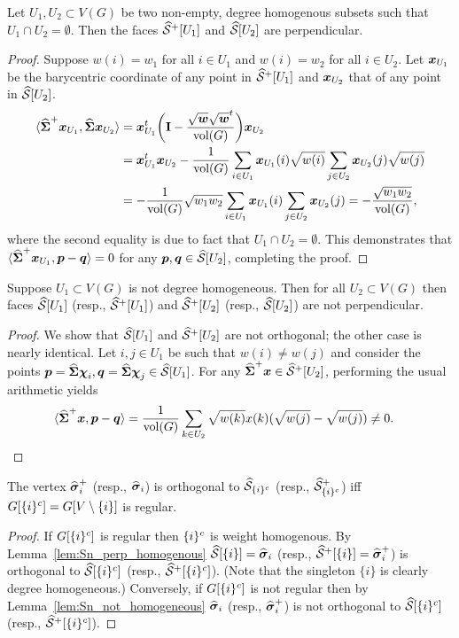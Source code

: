 \begin{lemma}
	\label{lem:Sn_perp_homogenous}
	Let $U_1,U_2\subset V(G)$ be two non-empty, degree homogenous subsets such that $U_1\cap U_2=\emptyset$. Then the faces $\widehat{\mathcal{S}}^+[U_1]$ and $\widehat{\mathcal{S}}[U_2]$ are perpendicular. 
\end{lemma}
\begin{proof}
	Suppose $w(i)=w_1$ for all $i\in U_1$ and $w(i)=w_2$ for all $i\in U_2$. Let $\vb*{x}_{U_1}$ be the barycentric coordinate of any point in $\widehat{\mathcal{S}}^+[U_1]$ and $\vb*{x}_{U_2}$ that of any point in $\widehat{\mathcal{S}}[U_2]$. 
	\begin{align*}
	\langle \widehat{\boldsymbol{\Sigma}}^+\vb*{x}_{U_1},\widehat{\boldsymbol{\Sigma}}\vb*{x}_{U_2}\rangle &= \vb*{x}_{U_1}^t \bigg(\vb{I}-\frac{\sqrt{\vb*{w}}\sqrt{\vb*{w}}^t}{\textnormal{vol}(G)}\bigg) \vb*{x}_{U_2}\\
	&= \vb*{x}_{U_1}^t\vb*{x}_{U_2} - \frac{1}{\textnormal{vol}(G)}\sum_{i\in U_1}\vb*{x}_{U_1}(i)\sqrt{w(i)}\sum_{j\in U_2}\vb*{x}_{U_2}(j) \sqrt{w(j)} \\
	&= -\frac{1}{\textnormal{vol}(G)}\sqrt{w_1w_2}\sum_{i\in U_1}\vb*{x}_{U_1}(i) \sum_{j\in U_2}\vb*{x}_{U_2}(j) = -\frac{\sqrt{w_1w_2}}{\textnormal{vol}(G)},
	\end{align*} 
	where the second equality is due to fact that $U_1\cap U_2=\emptyset$. This demonstrates that $\langle \widehat{\boldsymbol{\Sigma}}^+\vb*{x}_{U_1},\vb*{p}-\vb*{q}\rangle=0$ for any $\vb*{p},\vb*{q}\in\widehat{\mathcal{S}}[U_2]$, completing the proof. 
\end{proof}

\begin{lemma}
	\label{lem:Sn_not_homogeneous}
	Suppose  $U_1\subset V(G)$ is not degree homogeneous. Then for all $U_2\subset V(G)$ then faces $\widehat{\mathcal{S}}[U_1]$ (resp., $\widehat{\mathcal{S}}^+[U_1]$) and $\widehat{\mathcal{S}}^+[U_2]$ (resp., $\widehat{\mathcal{S}}[U_2]$) are not perpendicular. 
\end{lemma}
\begin{proof}
	We show that $\widehat{\mathcal{S}}[U_1]$ and $\widehat{\mathcal{S}}^+[U_2]$ are not orthogonal; the other case is nearly identical. Let $i,j\in U_1$ be such that $w(i)\neq w(j)$ and consider the points $\vb*{p}=\widehat{\boldsymbol{\Sigma}}\boldsymbol{\chi}_i,\vb*{q}=\widehat{\boldsymbol{\Sigma}}\boldsymbol{\chi}_j\in\widehat{\mathcal{S}}[U_1]$. For any $\widehat{\boldsymbol{\Sigma}}^+\vb*{x}\in\widehat{\mathcal{S}}^+[U_2]$, performing the usual arithmetic yields
	\begin{align*}
	\langle \widehat{\boldsymbol{\Sigma}}^+\vb*{x},\vb*{p}-\vb*{q}\rangle &= \frac{1}{\textnormal{vol}(G)} \sum_{k\in U_2}\sqrt{w(k)}x(k)(\sqrt{w(j)}-\sqrt{w(j)}) \neq 0.\qedhere
	\end{align*}
\end{proof}

\begin{corollary}
	\label{cor:Sn_orthog_iff_regular}
	The vertex $\widehat{\vb*{\sigma}}_i^+$ (resp., $\widehat{\vb*{\sigma}}_i$) is orthogonal to $\widehat{\mathcal{S}}_{\{i\}^c}$ (resp., $\widehat{\mathcal{S}}^+_{\{i\}^c}$) iff $G[{\{i\}^c}]=G[V\setminus\{i\}]$ is regular. 
\end{corollary}
\begin{proof}
	If $G[{\{i\}^c}]$ is regular then ${\{i\}^c}$ is weight homogenous. By Lemma~\ref{lem:Sn_perp_homogenous} $\widehat{\mathcal{S}}[\{i\}]=\widehat{\vb*{\sigma}}_i$ (resp., $\widehat{\mathcal{S}}^+[\{i\}]=\widehat{\vb*{\sigma}}_i^+$) is orthogonal to $\widehat{\mathcal{S}}[{\{i\}^c}]$ (resp., $\widehat{\mathcal{S}}^+[{\{i\}^c}]$). (Note that the singleton $\{i\}$ is clearly degree homogeneous.) Conversely, if $G[{\{i\}^c}]$ is not regular then by Lemma~\ref{lem:Sn_not_homogeneous} $\widehat{\vb*{\sigma}}_i$ (resp., $\widehat{\vb*{\sigma}}_i^+$) is not orthogonal to $\widehat{\mathcal{S}}[{\{i\}^c}]$ (resp., $\widehat{\mathcal{S}}^+[{\{i\}^c}]$).
\end{proof}

